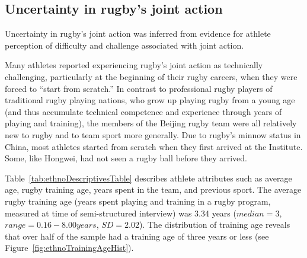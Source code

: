 \begin{CJK}{UTF8}{gbsn}
\subsection{Uncertainty in rugby's joint action\label{sect:uncertaintyAthlete}}

Uncertainty in rugby's joint action was inferred from evidence for athlete perception of difficulty and challenge associated with joint action.

Many athletes reported experiencing rugby's joint action as technically challenging, particularly at the beginning of their rugby careers, when they were forced to ``start from scratch.''  In contrast to professional rugby players of traditional rugby playing nations, who grow up playing rugby from a young age (and thus accumulate technical competence and experience through years of playing and training), the members of the Beijing rugby team were all relatively new to rugby and to team sport more generally.   Due to rugby's minnow status in China, most athletes started from scratch when they first arrived at the Institute.  Some, like Hongwei, had not seen a rugby ball before they arrived.

Table~\ref{tab:ethnoDescriptivesTable} describes athlete attributes such as average age, rugby training age, years spent in the team, and previous sport.  The average rugby training age (years spent playing and training in a rugby program, measured at time of semi-structured interview) was 3.34 years ($median = 3$, $range = 0.16 - 8.00 years$, $SD = 2.02$). The distribution of training age reveals that over half of the sample had a training age of three years or less (see Figure~\ref{fig:ethnoTrainingAgeHist}).






\end{CJK}

